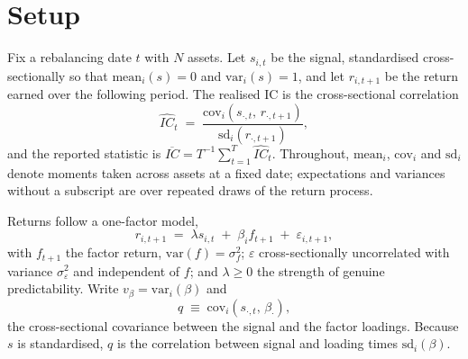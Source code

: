 \documentclass[11pt,a4paper]{article}
\newcommand{\ICh}{\widehat{IC}}
\begin{document}
\section{Setup}\label{sec:setup}

Fix a rebalancing date $t$ with $N$ assets. Let $s_{i,t}$ be the signal, standardised
cross-sectionally so that $\mathrm{mean}_i(s) = 0$ and $\mathrm{var}_i(s) = 1$, and let
$r_{i,t+1}$ be the return earned over the following period. The realised IC is the
cross-sectional correlation
\begin{equation}
\ICh_t \;=\; \frac{\mathrm{cov}_i(s_{\cdot,t},\, r_{\cdot,t+1})}{\mathrm{sd}_i(r_{\cdot,t+1})},
\label{eq:icdef}
\end{equation}
and the reported statistic is $\overline{IC} = T^{-1}\sum_{t=1}^{T}\ICh_t$. Throughout,
$\mathrm{mean}_i$, $\mathrm{cov}_i$ and $\mathrm{sd}_i$ denote moments taken across
assets at a fixed date; expectations and variances without a subscript are over repeated
draws of the return process.

Returns follow a one-factor model,
\begin{equation}
r_{i,t+1} \;=\; \lambda s_{i,t} \;+\; \beta_i f_{t+1} \;+\; \varepsilon_{i,t+1},
\label{eq:model}
\end{equation}
with $f_{t+1}$ the factor return, $\mathrm{var}(f) = \sigma_f^2$; $\varepsilon$
cross-sectionally uncorrelated with variance $\sigma_\varepsilon^2$ and independent of
$f$; and $\lambda \geq 0$ the strength of genuine predictability. Write
$v_\beta = \mathrm{var}_i(\beta)$ and
\begin{equation}
q \;\equiv\; \mathrm{cov}_i(s_{\cdot,t},\, \beta_\cdot),
\label{eq:q}
\end{equation}
the cross-sectional covariance between the signal and the factor loadings. Because $s$
is standardised, $q$ is the correlation between signal and loading times
$\mathrm{sd}_i(\beta)$.
\end{document}

